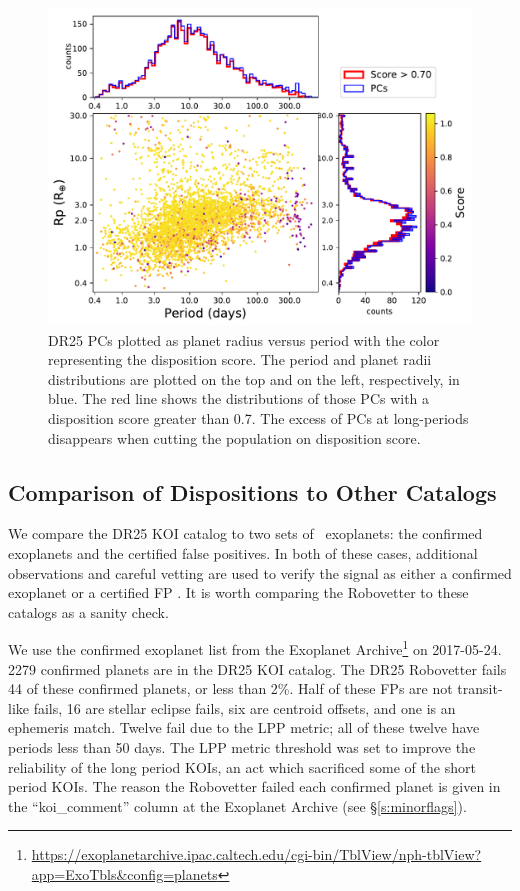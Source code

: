 \begin{figure}[htb]
    \centering
    \includegraphics[width=\linewidth]{f7.pdf}
    \caption{DR25 PCs plotted as planet radius versus period with the color representing the disposition score. The period and planet radii distributions are plotted on the top and on the left, respectively, in blue. The red line shows the distributions of those PCs with a disposition score greater than 0.7. The excess of PCs at long-periods disappears when cutting the population on disposition score. }
    \label{f:catalogPlot}
\end{figure}

\subsection{Comparison of Dispositions to Other Catalogs}
We compare the DR25 KOI catalog to two sets of \Kepler\ exoplanets: the confirmed exoplanets and the certified false positives.  In both of these cases, additional observations and careful vetting are used to verify the signal as either a confirmed exoplanet or a certified FP \citep{Bryson2017c}. It is worth comparing the Robovetter to these catalogs as a sanity check.  

We use the confirmed exoplanet list from the Exoplanet Archive\footnote{\url{https://exoplanetarchive.ipac.caltech.edu/cgi-bin/TblView/nph-tblView?app=ExoTbls\&config=planets}} on 2017-05-24.  2279 confirmed planets are in the DR25 KOI catalog.  The DR25 Robovetter fails 44 of these confirmed planets, or less than 2\%. Half of these FPs are not transit-like fails, 16 are stellar eclipse fails, six are centroid offsets, and one is an ephemeris match. Twelve fail due to the LPP metric; all of these twelve have periods less than 50 days.  The LPP metric threshold was set to improve the reliability of the long period KOIs, an act which sacrificed some of the short period KOIs.  The reason the Robovetter failed each confirmed planet is given in the ``koi\_comment'' column at the Exoplanet Archive (see \S\ref{s:minorflags}). 

